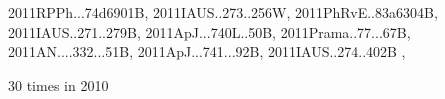\documentclass[12pt]{article}
\begin{document}
\begin{description}
{2011RPPh...74d6901B,%
2011IAUS..273..256W,%
2011PhRvE..83a6304B,%
2011IAUS..271..279B,%
2011ApJ...740L..50B,%
2011Prama..77...67B,%
2011AN....332...51B,%
2011ApJ...741...92B,%
2011IAUS..274..402B%
},\item
30 times in 2010 \citep{
2010arXiv1008.5040H,%
2010PhRvE..82a6304M,%
2010Ap&SS.328..245G,%
2010PhRvD..81l3002K,%
2010ApJ...715L..68L,%
2010MNRAS.404..475J,%
2010PhRvE..81c6401D,%
2010EAS....41..167F,%
2010AN....331..130M,%
2010IAUS..264..197M,%
2010ApJ...719L...1M,%
2010AN....331...34K,%
2010ApJ...719...67K,%
2010A&A...518A..22K,%
}
\end{description}
\end{document}
